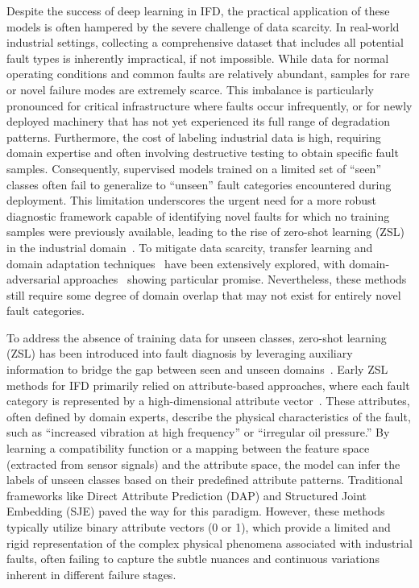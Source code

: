 Despite the success of deep learning in IFD, the practical application of these models is often hampered by the severe challenge of data scarcity. In real-world industrial settings, collecting a comprehensive dataset that includes all potential fault types is inherently impractical, if not impossible. While data for normal operating conditions and common faults are relatively abundant, samples for rare or novel failure modes are extremely scarce. This imbalance is particularly pronounced for critical infrastructure where faults occur infrequently, or for newly deployed machinery that has not yet experienced its full range of degradation patterns. Furthermore, the cost of labeling industrial data is high, requiring domain expertise and often involving destructive testing to obtain specific fault samples. Consequently, supervised models trained on a limited set of ``seen'' classes often fail to generalize to ``unseen'' fault categories encountered during deployment. This limitation underscores the urgent need for a more robust diagnostic framework capable of identifying novel faults for which no training samples were previously available, leading to the rise of zero-shot learning (ZSL) in the industrial domain~\cite{xian2019zero,song2025generalized}. To mitigate data scarcity, transfer learning and domain adaptation techniques~\cite{pan2009survey,long2015learning,sun2016deep,han2020deep,zhang2017deep} have been extensively explored, with domain-adversarial approaches~\cite{ganin2016domain} showing particular promise. Nevertheless, these methods still require some degree of domain overlap that may not exist for entirely novel fault categories.

To address the absence of training data for unseen classes, zero-shot learning (ZSL) has been introduced into fault diagnosis by leveraging auxiliary information to bridge the gap between seen and unseen domains~\cite{fu2015transductive,xian2019zero}. Early ZSL methods for IFD primarily relied on attribute-based approaches, where each fault category is represented by a high-dimensional attribute vector~\cite{lampert2009learning}. These attributes, often defined by domain experts, describe the physical characteristics of the fault, such as ``increased vibration at high frequency'' or ``irregular oil pressure.'' By learning a compatibility function or a mapping between the feature space (extracted from sensor signals) and the attribute space, the model can infer the labels of unseen classes based on their predefined attribute patterns. Traditional frameworks like Direct Attribute Prediction (DAP) and Structured Joint Embedding (SJE) paved the way for this paradigm. However, these methods typically utilize binary attribute vectors (0 or 1), which provide a limited and rigid representation of the complex physical phenomena associated with industrial faults, often failing to capture the subtle nuances and continuous variations inherent in different failure stages.

